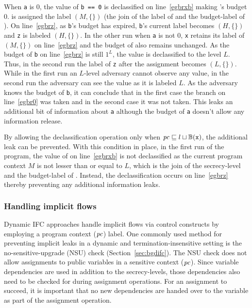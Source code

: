 When \texttt{a} is $0$, the value of \texttt{b == 0} is declassified
on line~\ref{egbrxb} making 's budget $0$.  is assigned
the label $(M, \{\})$ (the join of the label of  and the
budget-label of ). On line~\ref{egbrz}, as \texttt{b}'s budget
has expired, \texttt{b}'s current label becomes $(H, \{\})$ and
\texttt{z} is labeled $(H, \{\})$. In the other run when \texttt{a} is
not $0$, \texttt{x} retains its label of $(M, \{\})$ on
line~\ref{egbrz} and the budget of  also remains unchanged. As
the budget of \texttt{b} on line~\ref{egbrz} is still $1^L$, the value is
declassified to the level $L$. Thus, in the second run the label of
\texttt{z} after the assignment becomes $(L, \{\})$.  While in the
first run an $L$-level adversary cannot observe any value, in the
second run  the adversary can see the value as it is labeled $L$. As
the adversary knows the budget of \texttt{b}, it can conclude that in
the first case  the branch on line~\ref{egbr0} was taken and in the
second case it was not taken. This leaks an additional bit of
information about \texttt{a} although the budget of \texttt{a} doesn't
allow any information release. 

By allowing the declassification operation only when $\mathit{pc} \sqsubseteq l \sqcup
\mathbb{B}(\texttt{x})$, the additional leak can be prevented. With this
condition in place, in the first run of the program, the value of 
 on line~\ref{egbrxb} is not declassified as the current
program context $M$ is not lesser than or equal to $L$, which is the
join of the secrecy-level and the budget-label of . Instead, the
declassification occurs on line~\ref{egbrz} thereby preventing any
additional information leaks. 

\subsubsection{\textbf{Handling implicit flows}}
\label{aspect:if}
Dynamic IFC approaches handle implicit flows via control constructs by
employing a program context ($\mathit{pc}$) label. One commonly used method
for preventing implicit leaks in a dynamic and termination-insensitive 
setting is the no-sensitive-upgrade (NSU) check
(Section~\ref{sec:bgdifc}). The NSU check does not allow assignments
to public variables in a sensitive context ($\mathit{pc}$). Since variable
dependencies are used in addition to the secrecy-levels, those
dependencies also need to be checked for during assignment
operations. For an assignment to succeed, it is important that
no new dependencies are handed over to the variable as part of the
assignment operation. 

